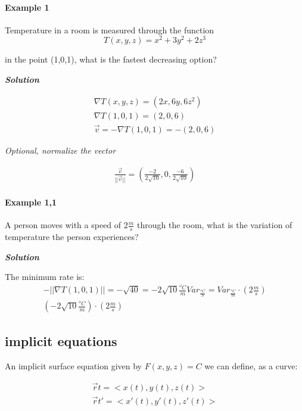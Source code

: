 \documentclass[11pt,fleqn]{book} %
\begin{document}
\paragraph{Example 1}

Temperature in a room is measured through the function $$T(x,y,z) = x^2 + 3y^2 + 2z^3$$

in the point (1,0,1), what is the fastest decreasing option?

\textbf{\textit{Solution}}

\begin{gather}
    \nabla T(x,y,z) = (2x,6y,6z^2)\\
    \nabla T(1,0,1) = (2,0,6)\\
    \vec{v} = - \nabla T(1,0,1) = -(2,0,6)
\end{gather}

\textit{Optional, normalize the vector}

\begin{gather}
    \frac{\vec{v}}{||\vec{v}||} = (\frac{-2}{2 \sqrt{10}}, 0, \frac{-6}{2\sqrt{10}})
\end{gather}

\paragraph{Example 1,1}

A person moves with a speed of $2 \frac{m}{s}$ through the room, what is the variation of temperature the person experiences?

\textbf{\textit{Solution}}

The minimum rate is:
\begin{gather}
    -||\nabla T(1,0,1)|| = - \sqrt{40} = -2\sqrt{10} \frac{{}^oC}{m}
    Var_{\frac{{}^oC}{S}} = Var_{\frac{{}^oC}{m}} \cdot (2 \frac{m}{s})\\
    (-2 \sqrt{10}\frac{{}^oC}{m}) \cdot (2 \frac{m}{s})
\end{gather}

\subsection{implicit equations}

An implicit surface equation given by $F(x,y,z) = C$ we can define, as a curve:

\begin{gather}
    \vec{r}t = <x(t),y(t),z(t)> \\
    \vec{r}t' = <x'(t),y'(t),z'(t)> 
\end{gather}
\end{document}
